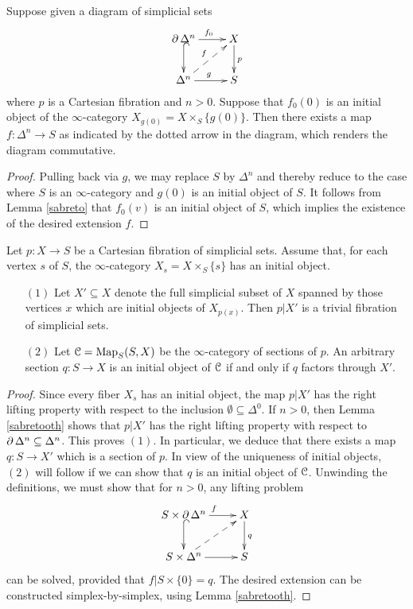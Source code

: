 \begin{lemma}\label{sabretooth}
Suppose given a diagram of simplicial sets
$$ \xymatrix{ \bd \Delta^n \ar[r]^{f_0} \ar@{^{(}->}[d] & X \ar[d]^{p} \\
\Delta^n \ar@{-->}[ur]^{f} \ar[r]^{g} & S }$$
where $p$ is a Cartesian fibration and $n > 0$. Suppose that
$f_0(0)$ is an initial object of the $\infty$-category $X_{g(0)} = X \times_{S} \{ g(0) \}$.
Then there exists a map $f: \Delta^n \rightarrow S$ as indicated by the dotted arrow in the diagram, which renders the diagram commutative.
\end{lemma}

\begin{proof}
Pulling back via $g$, we may replace $S$ by $\Delta^n$ and thereby reduce to the case where $S$ is an $\infty$-category and $g(0)$ is an initial object of $S$. It follows from Lemma \ref{sabreto} that 
$f_0(v)$ is an initial object of $S$, which implies the existence of the desired extension $f$.
\end{proof}

\begin{proposition}\label{topaz}
Let $p: X \rightarrow S$ be a Cartesian fibration of
simplicial sets. Assume that, for each vertex $s$ of $S$, the
$\infty$-category $X_{s} = X \times_{S} \{s\}$ has an initial object. 
\begin{itemize}
\item[$(1)$] Let $X' \subseteq X$
denote the full simplicial subset of $X$ spanned by those vertices $x$ which are initial objects of $X_{p(x)}$. Then $p|X'$ is a trivial fibration of simplicial sets.
\item[$(2)$] Let $\operatorname{\mathcal{C}} = \operatorname{{Map}}_{S}(S, X)$ be the $\infty$-category of sections of $p$.
An arbitrary section $q: S \rightarrow X$ is an initial object of $\operatorname{\mathcal{C}}$ if and only if
$q$ factors through $X'$.
\end{itemize}
\end{proposition}

\begin{proof}
Since every fiber $X_{s}$ has an initial object, the map $p|X'$ has the right lifting
property with respect to the inclusion $\emptyset \subseteq \Delta^0$. If $n > 0$,
then Lemma \ref{sabretooth} shows that $p|X'$ has the right lifting property with
respect to $\operatorname{\partial} \Delta^n \subseteq \Delta^n$. This proves $(1)$. In particular, we deduce
that there exists a map $q: S \rightarrow X'$ which is a section of $p$. In view of the uniqueness of initial objects, $(2)$ will follow if we can show that $q$ is an initial object of $\operatorname{\mathcal{C}}$.
Unwinding the definitions, we must show that for $n > 0$, any lifting problem
$$ \xymatrix{ S \times \bd \Delta^n \ar[r]^{f} \ar@{^{(}->}[d] & X \ar[d]^{q} \\
S \times \Delta^n \ar[r] \ar@{-->}[ur] & S}$$
can be solved, provided that $f | S \times \{0\} = q$. The desired extension can be constructed simplex-by-simplex, using Lemma \ref{sabretooth}. 
\end{proof}

